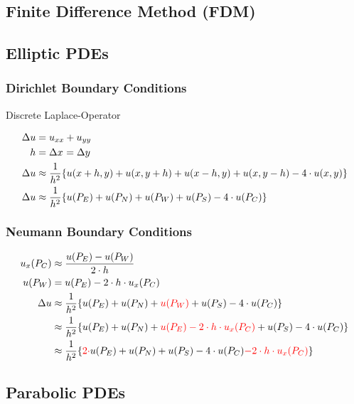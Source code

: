 \documentclass[
	final,
	a4paper,
	oneside,
	parskip=full,
	headings=standardclasses,
	headings=big,
	pointednumbers,
    fleqn
]{scrartcl}
\newcommand{\f}[2]{\frac{#1}{#2}}
\newcommand{\kl}[1]{{\left( #1 \right)}}
\newcommand{\kq}[1]{{\left\{ #1 \right\}}}
\begin{document}
    \subsection*{Finite Difference Method (FDM)}
    \subsection*{Elliptic PDEs}
    \subsubsection*{Dirichlet Boundary Conditions}
    
    Discrete Laplace-Operator
    
    \begin{align*}
        \Delta u & = u_{xx} + u_{yy} \\
        h        & = \dx = \dy \\
        \Delta u & \approx \f{1}{h^2} \kq{u\kl{x + h, y} + u\kl{x, y + h} + u\kl{x - h, y} + u\kl{x, y - h} - 4 \cdot u\kl{x,y}} \\
        \Delta u & \approx \f{1}{h^2} \kq{u\kl{P_E} + u\kl{P_N} + u\kl{P_W} + u\kl{P_S} - 4 \cdot u\kl{P_C}}
    \end{align*}

    \subsubsection*{Neumann Boundary Conditions}

    \begin{align*}
        u_x\kl{P_C} & \approx \f{u\kl{P_E} - u\kl{P_W}}{2\cdot h} \\
        u\kl{P_W}   & = u\kl{P_E} - 2\cdot h \cdot u_x\kl{P_C} \\
        \Delta u    & \approx \f{1}{h^2} \kq{u\kl{P_E} + u\kl{P_N} + {\color{red}u\kl{P_W}} + u\kl{P_S} - 4 \cdot u\kl{P_C}} \\
                    & \approx \f{1}{h^2} \kq{u\kl{P_E} + u\kl{P_N} + {\color{red}u\kl{P_E} - 2\cdot h \cdot u_x\kl{P_C}} + u\kl{P_S} - 4 \cdot u\kl{P_C}} \\
                    & \approx \f{1}{h^2} \kq{{\color{red}2\cdot}u\kl{P_E} + u\kl{P_N} + u\kl{P_S} - 4 \cdot u\kl{P_C} {\color{red} - 2\cdot h \cdot u_x\kl{P_C}}} \\
    \end{align*}
    
    \subsection*{Parabolic PDEs}
\end{document}
